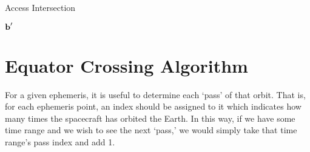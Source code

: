 \begin{algorithm}[h] 
    \caption{Access Intersection} 
    \label{alg:access-intersection}
    \begin{algorithmic}[1]




	     

	     

		 
		
		\Else
		\EndIf


	    \EndWhile 


	     

	\State \Return $\bm{\mathrm{b}}'$
	\EndFunction
    \end{algorithmic}

\end{algorithm}


\section{Equator Crossing Algorithm} \label{sec:equator-crossing}

For a given ephemeris, it is useful to determine each `pass' of that orbit.
That is, for each ephemeris point, an index should be assigned to it which
indicates how many times the spacecraft has orbited the Earth. In this way, if
we have some time range and we wish to see the next `pass,' we would simply
take that time range's pass index and add 1.

